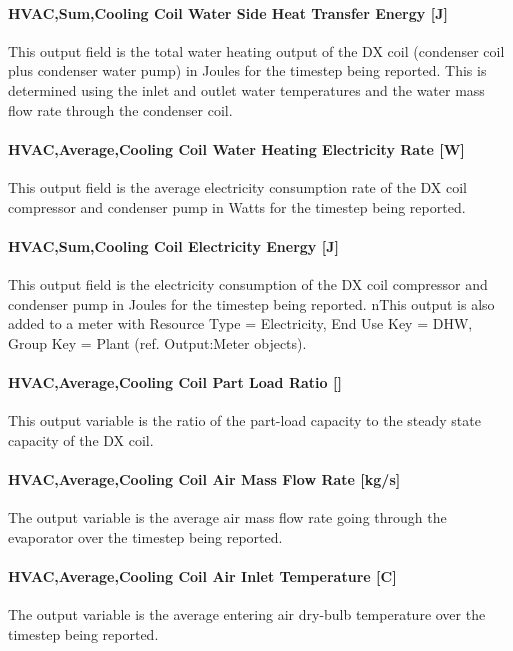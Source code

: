 \paragraph{HVAC,Sum,Cooling Coil Water Side Heat Transfer Energy {[}J{]}}\label{vshpwhheating-output-cooling-coil-water-side-heat-transfer-energy}
This output field is the total water heating output of the DX coil (condenser coil plus condenser water pump) in Joules for the timestep being reported.
This is determined using the inlet and outlet water temperatures and the water mass flow rate through the condenser coil.

\paragraph{HVAC,Average,Cooling Coil Water Heating Electricity Rate {[}W{]}}\label{vshpwhheating-output-cooling-coil-water-heating-electric-power}
This output field is the average electricity consumption rate of the DX coil compressor and condenser pump in Watts for the timestep being reported.

\paragraph{HVAC,Sum,Cooling Coil Electricity Energy {[}J{]}}\label{vshpwhheating-output-cooling-coil-electric-energy}
This output field is the electricity consumption of the DX coil compressor and condenser pump in Joules for the timestep being reported.
nThis output is also added to a meter with Resource Type = Electricity, End Use Key = DHW, Group Key = Plant (ref. Output:Meter objects).

\paragraph{HVAC,Average,Cooling Coil Part Load Ratio {[}{]}}\label{vshpwhheating-output-cooling-coil-part-load-ratio}
This output variable is the ratio of the part-load capacity to the steady state capacity of the DX coil.

\paragraph{HVAC,Average,Cooling Coil Air Mass Flow Rate {[}kg/s{]}}\label{vshpwhheating-output-cooling-coil-air-mass-flow-rate}
The output variable is the average air mass flow rate going through the evaporator over the timestep being reported.

\paragraph{HVAC,Average,Cooling Coil Air Inlet Temperature {[}C{]}}\label{vshpwhheating-output-cooling-coil-air-inlet-temperature}
The output variable is the average entering air dry-bulb temperature over the timestep being reported.

